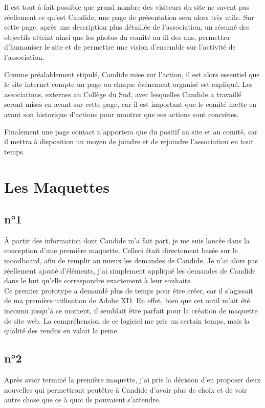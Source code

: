 \documentclass[a4,10pt,french]{sphinxmanual}
\begin{document}
\sphinxAtStartPar
Il est tout à fait possible que grand nombre des visiteurs du site ne savent pas réellement ce qu’est Candide, une page de présentation sera alors très utile. Sur cette page, après une description plus détaillée de l’association, un résumé des objectifs atteint ainsi que les photos du comité au fil des ans, permettra d’humaniser le site et de permettre une vision d’ensemble sur l’activité de l’association.

\sphinxAtStartPar
Comme préalablement stipulé, Candide mise sur l’action, il est alors essentiel que le site internet compte un page ou chaque événement organisé est expliqué. Les associations, externes au Collège du Sud, avec lesquelles Candide a travaillé seront mises en avant sur cette page, car il est important que le comité mette en avant son historique d’actions pour montrer que ses actions sont concrètes.

\sphinxAtStartPar
Finalement une page contact n’apportera que du positif au site et au comité, car il mettra à disposition un moyen de joindre et de rejoindre l’association en tout temps.


\section{Les Maquettes}
\label{\detokenize{chapitre-02:les-maquettes}}

\subsection{n°1}
\label{\detokenize{chapitre-02:n1}}
\sphinxAtStartPar
À partir des information dont Candide m’a fait part, je me suis lancée dans la conception d’une première maquette. Celle\sphinxhyphen{}ci était directement basée sur le moodboard, afin de remplir au mieux les demandes de Candide. Je n’ai alors pas réellement ajouté d’éléments, j’ai simplement appliqué les demandes de Candide dans le but qu’elle correspondre exactement à leur souhaits.\\
Ce premier prototype a demandé plus de temps pour être créer, car il s’agissait de ma première utilisation de Adobe XD. En effet, bien que cet outil m’ait été inconnu jusqu’à ce moment, il semblait être parfait pour la création de maquette de site web. La compréhension de ce logiciel me pris un certain temps, mais la qualité des rendus en valait la peine.


\subsection{n°2}
\label{\detokenize{chapitre-02:n2}}
\sphinxAtStartPar
Après avoir terminé la première maquette, j’ai pris la décision d’en proposer deux nouvelles qui permettront peut\sphinxhyphen{}être à Candide d’avoir plus de choix et de voir autre chose que ce à quoi ils pouvaient s’attendre.
\end{document}
